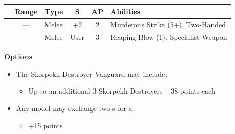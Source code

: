 \begin{minipage}[t]{0.72\textwidth}
	\begin{tabular}{L{90 pt} c C{40pt} *{2}{c} >{\raggedright\arraybackslash}p{130pt}}
		& Range & Type & S & AP & Abilities \\
		\hline
		 & — & Melee & +2 & 2 & Murderous Strike (5+), Two-Handed \\
		 & — & Melee & User & 3 & Reaping Blow (1), Specialist Weapon \\
	\end{tabular}
	
	\vspace*{2em}
	\textbf{Options}
	\begin{itemize}
		\item The Skorpekh Destroyer Vanguard may include:
		\begin{itemize}
			\item Up to an additional 3 Skorpekh Destroyers \dotfill +38 points each
		\end{itemize}
		\item Any model may exchange two s for a:
		\begin{itemize}
			\item {} \dotfill +15 points
		\end{itemize}
	\end{itemize}
\end{minipage}
\hspace{0.5em}




\newpage
\subsubsection[Triarch Judicator Vanguard]{}

